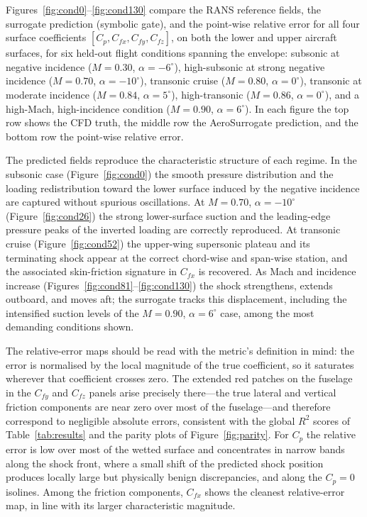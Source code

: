 \documentclass{WCCM-ECCOMAS_2026_Full_Paper}
\begin{document}
Figures~\ref{fig:cond0}--\ref{fig:cond130} compare the RANS reference
fields, the surrogate prediction (symbolic gate), and the point-wise
relative error for all four surface coefficients
$[C_p, C_{fx}, C_{fy}, C_{fz}]$, on both the lower and upper aircraft
surfaces, for six held-out flight conditions spanning the envelope:
subsonic at negative incidence ($M{=}0.30$, $\alpha{=}-6^{\circ}$),
high-subsonic at strong negative incidence
($M{=}0.70$, $\alpha{=}-10^{\circ}$), transonic cruise
($M{=}0.80$, $\alpha{=}0^{\circ}$), transonic at moderate incidence
($M{=}0.84$, $\alpha{=}5^{\circ}$), high-transonic
($M{=}0.86$, $\alpha{=}0^{\circ}$), and a high-Mach, high-incidence
condition ($M{=}0.90$, $\alpha{=}6^{\circ}$).  In each figure the top
row shows
the CFD truth, the middle row the AeroSurrogate prediction, and the
bottom row the point-wise relative error.

The predicted fields reproduce the characteristic structure of each
regime.  In the subsonic case (Figure~\ref{fig:cond0}) the smooth
pressure distribution and the loading redistribution toward the lower
surface induced by the negative incidence are captured without
spurious oscillations.  At $M{=}0.70$, $\alpha{=}-10^{\circ}$
(Figure~\ref{fig:cond26}) the strong lower-surface suction and the
leading-edge pressure peaks of the inverted loading are correctly
reproduced.  At transonic cruise (Figure~\ref{fig:cond52}) the
upper-wing supersonic plateau and its terminating shock appear at the
correct chord-wise and span-wise station, and the associated
skin-friction signature in $C_{fx}$ is recovered.  As Mach and
incidence increase (Figures~\ref{fig:cond81}--\ref{fig:cond130}) the
shock strengthens, extends outboard, and moves aft; the surrogate
tracks this displacement, including the intensified suction levels
of the $M{=}0.90$, $\alpha{=}6^{\circ}$ case, among the most
demanding conditions shown.

The relative-error maps should be read with the metric's definition
in mind: the error is normalised by the local magnitude of the true
coefficient, so it saturates wherever that coefficient crosses zero.
The extended red patches on the fuselage in the $C_{fy}$ and
$C_{fz}$ panels arise precisely there---the true lateral and vertical
friction components are near zero over most of the fuselage---and
therefore correspond to negligible absolute errors, consistent with
the global $R^{2}$ scores of Table~\ref{tab:results} and the parity
plots of Figure~\ref{fig:parity}.  For $C_p$ the relative error is
low over most of the wetted surface and concentrates in narrow bands
along the shock front, where a small shift of the predicted shock
position produces locally large but physically benign discrepancies,
and along the $C_p{=}0$ isolines.  Among the friction components,
$C_{fx}$ shows the cleanest relative-error map, in line with its
larger characteristic magnitude.
\end{document}

